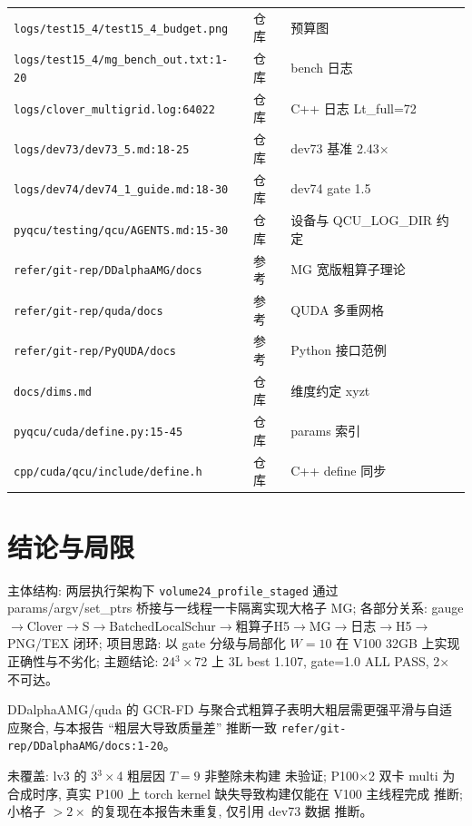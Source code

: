 \documentclass[UTF8]{ctexart}
\begin{document}
\begin{xltabular}{\textwidth}{llX}
\texttt{\nolinkurl{logs/test15_4/test15_4_budget.png}} & 仓库 & 预算图 \\
\texttt{\nolinkurl{logs/test15_4/mg_bench_out.txt:1-20}} & 仓库 & bench 日志 \\
\texttt{\nolinkurl{logs/clover_multigrid.log:64022}} & 仓库 & C++ 日志 Lt\_full=72 \\
\texttt{\nolinkurl{logs/dev73/dev73_5.md:18-25}} & 仓库 & dev73 基准 2.43$\times$ \\
\texttt{\nolinkurl{logs/dev74/dev74_1_guide.md:18-30}} & 仓库 & dev74 gate 1.5 \\
\texttt{\nolinkurl{pyqcu/testing/qcu/AGENTS.md:15-30}} & 仓库 & 设备与 QCU\_LOG\_DIR 约定 \\
\texttt{\nolinkurl{refer/git-rep/DDalphaAMG/docs}} & 参考 & MG 宽版粗算子理论 \\
\texttt{\nolinkurl{refer/git-rep/quda/docs}} & 参考 & QUDA 多重网格 \\
\texttt{\nolinkurl{refer/git-rep/PyQUDA/docs}} & 参考 & Python 接口范例 \\
\texttt{\nolinkurl{docs/dims.md}} & 仓库 & 维度约定 xyzt \\
\texttt{\nolinkurl{pyqcu/cuda/define.py:15-45}} & 仓库 & params 索引 \\
\texttt{\nolinkurl{cpp/cuda/qcu/include/define.h}} & 仓库 & C++ define 同步 \\
\bottomrule
\end{xltabular}

\section{结论与局限}
\begin{conclbox}
主体结构: 两层执行架构下 \texttt{\nolinkurl{volume24_profile_staged}} 通过 params/argv/set\_ptrs 桥接与一线程一卡隔离实现大格子 MG; 各部分关系: gauge$\to$Clover$\to$S$\to$BatchedLocalSchur$\to$粗算子H5$\to$MG$\to$日志$\to$H5$\to$PNG/TEX 闭环; 项目思路: 以 gate 分级与局部化 $W=10$ 在 V100 32GB 上实现正确性与不劣化; 主题结论: 24$^3\times$72 上 3L best 1.107, gate=1.0 ALL PASS, 2$\times$ 不可达。
\end{conclbox}
\begin{refbox}
DDalphaAMG/quda 的 GCR-FD 与聚合式粗算子表明大粗层需更强平滑与自适应聚合, 与本报告 ``粗层大导致质量差'' 推断一致 \textcolor{evidence}{\texttt{\nolinkurl{refer/git-rep/DDalphaAMG/docs:1-20}}}。
\end{refbox}
\begin{warnbox}
未覆盖: lv3 的 3$^3\times$4 粗层因 $T=9$ 非整除未构建 \textcolor{warn}{未验证}; P100$\times$2 双卡 multi 为合成时序, 真实 P100 上 torch kernel 缺失导致构建仅能在 V100 主线程完成 \textcolor{warn}{推断}; 小格子 $>2\times$ 的复现在本报告未重复, 仅引用 dev73 数据 \textcolor{warn}{推断}。
\end{warnbox}
\end{document}
